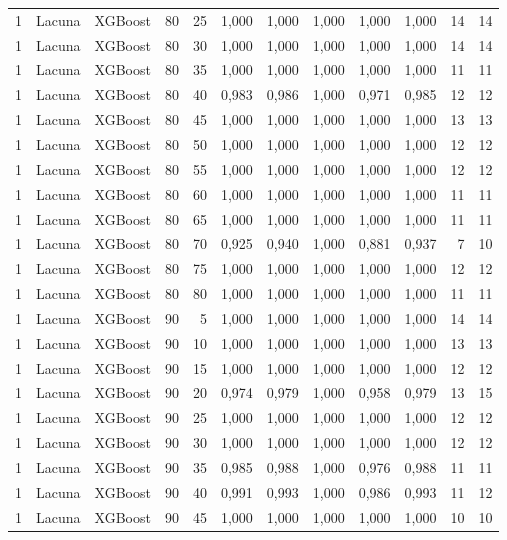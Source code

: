 \begin{longtable}{ccclrrrrrrrr}
1 & Lacuna & XGBoost & 80 & 25 & 1,000 & 1,000 & 1,000 & 1,000 & 1,000 & 14 & 14 \\
1 & Lacuna & XGBoost & 80 & 30 & 1,000 & 1,000 & 1,000 & 1,000 & 1,000 & 14 & 14 \\
1 & Lacuna & XGBoost & 80 & 35 & 1,000 & 1,000 & 1,000 & 1,000 & 1,000 & 11 & 11 \\
1 & Lacuna & XGBoost & 80 & 40 & 0,983 & 0,986 & 1,000 & 0,971 & 0,985 & 12 & 12 \\
1 & Lacuna & XGBoost & 80 & 45 & 1,000 & 1,000 & 1,000 & 1,000 & 1,000 & 13 & 13 \\
1 & Lacuna & XGBoost & 80 & 50 & 1,000 & 1,000 & 1,000 & 1,000 & 1,000 & 12 & 12 \\
1 & Lacuna & XGBoost & 80 & 55 & 1,000 & 1,000 & 1,000 & 1,000 & 1,000 & 12 & 12 \\
1 & Lacuna & XGBoost & 80 & 60 & 1,000 & 1,000 & 1,000 & 1,000 & 1,000 & 11 & 11 \\
1 & Lacuna & XGBoost & 80 & 65 & 1,000 & 1,000 & 1,000 & 1,000 & 1,000 & 11 & 11 \\
1 & Lacuna & XGBoost & 80 & 70 & 0,925 & 0,940 & 1,000 & 0,881 & 0,937 & 7 & 10 \\
1 & Lacuna & XGBoost & 80 & 75 & 1,000 & 1,000 & 1,000 & 1,000 & 1,000 & 12 & 12 \\
1 & Lacuna & XGBoost & 80 & 80 & 1,000 & 1,000 & 1,000 & 1,000 & 1,000 & 11 & 11 \\
1 & Lacuna & XGBoost & 90 & 5 & 1,000 & 1,000 & 1,000 & 1,000 & 1,000 & 14 & 14 \\
1 & Lacuna & XGBoost & 90 & 10 & 1,000 & 1,000 & 1,000 & 1,000 & 1,000 & 13 & 13 \\
1 & Lacuna & XGBoost & 90 & 15 & 1,000 & 1,000 & 1,000 & 1,000 & 1,000 & 12 & 12 \\
1 & Lacuna & XGBoost & 90 & 20 & 0,974 & 0,979 & 1,000 & 0,958 & 0,979 & 13 & 15 \\
1 & Lacuna & XGBoost & 90 & 25 & 1,000 & 1,000 & 1,000 & 1,000 & 1,000 & 12 & 12 \\
1 & Lacuna & XGBoost & 90 & 30 & 1,000 & 1,000 & 1,000 & 1,000 & 1,000 & 12 & 12 \\
1 & Lacuna & XGBoost & 90 & 35 & 0,985 & 0,988 & 1,000 & 0,976 & 0,988 & 11 & 11 \\
1 & Lacuna & XGBoost & 90 & 40 & 0,991 & 0,993 & 1,000 & 0,986 & 0,993 & 11 & 12 \\
1 & Lacuna & XGBoost & 90 & 45 & 1,000 & 1,000 & 1,000 & 1,000 & 1,000 & 10 & 10 \\

\end{longtable}
